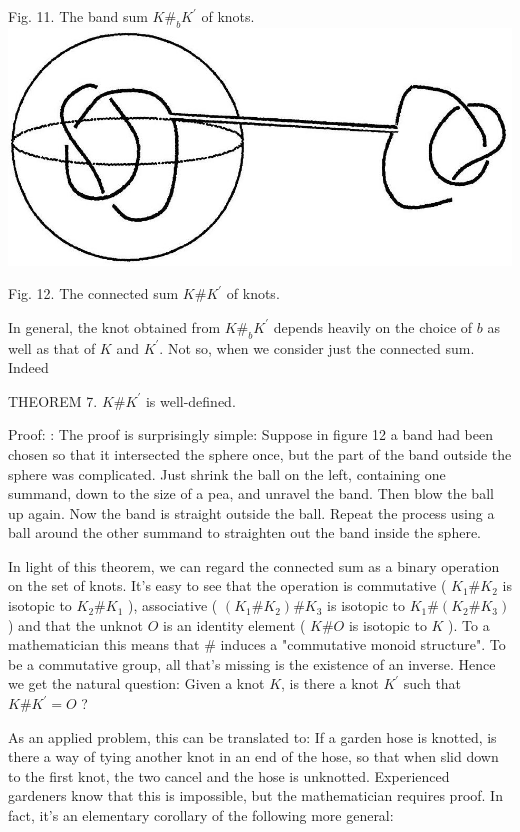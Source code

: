 \documentclass[10pt, letterpaper]{article}
\begin{document}
Fig. 11. The band sum $K \#_{b} K^{\prime}$ of knots.\\
\includegraphics[scale=0.2, center]{2025_05_21_037de704f595ce642d3eg-083}

Fig. 12. The connected sum $K \# K^{\prime}$ of knots.

In general, the knot obtained from $K \#_{b} K^{\prime}$ depends heavily on the choice of $b$ as well as that of $K$ and $K^{\prime}$. Not so, when we consider just the connected sum. Indeed

THEOREM 7. $K \# K^{\prime}$ is well-defined.

Proof: : The proof is surprisingly simple: Suppose in figure 12 a band had been chosen so that it intersected the sphere once, but the part of the band outside the sphere was complicated. Just shrink the ball on the left, containing one summand, down to the size of a pea, and unravel the band. Then blow the ball up again. Now the band is straight outside the ball. Repeat the process using a ball around the other summand to straighten out the band inside the sphere.

In light of this theorem, we can regard the connected sum as a binary operation on the set of knots. It's easy to see that the operation is commutative ( $K_{1} \# K_{2}$ is isotopic to $K_{2} \# K_{1}$ ), associative ( $\left(K_{1} \# K_{2}\right) \# K_{3}$ is isotopic to $K_{1} \#\left(K_{2} \# K_{3}\right)$ ) and that the unknot $O$ is an identity element ( $K \# O$ is isotopic to $K$ ). To a mathematician this means that \# induces a "commutative monoid structure". To be a commutative group, all that's missing is the existence of an inverse. Hence we get the natural question: Given a knot $K$, is there a knot $K^{\prime}$ such that $K \# K^{\prime}=O$ ?

As an applied problem, this can be translated to: If a garden hose is knotted, is there a way of tying another knot in an end of the hose, so that when slid down to the first knot, the two cancel and the hose is unknotted. Experienced gardeners know that this is impossible, but the mathematician requires proof. In fact, it's an elementary corollary of the following more general:
\end{document}
